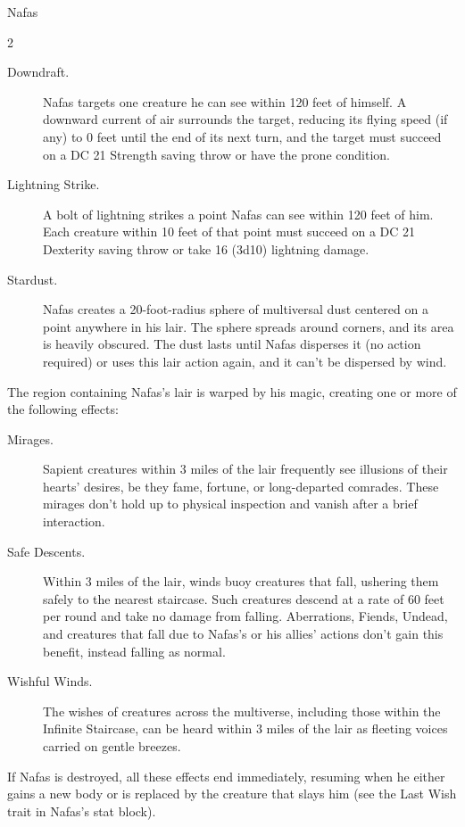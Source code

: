 \documentclass[10pt,a4paper,twoside,bg=print,twocolumn,openany,nodeprecatedcode]{dndbook}
\begin{document}
\begin{DndMonster}[float*=b,width=\textwidth + 8pt]{Nafas}
\begin{multicols}{2}
\begin{description}
\item[Downdraft.]
Nafas targets one creature he can see within 120 feet of himself. A downward current of air surrounds the target, reducing its flying speed (if any) to 0 feet until the end of its next turn, and the target must succeed on a DC 21 Strength saving throw or have the prone condition.
\item[Lightning Strike.]
A bolt of lightning strikes a point Nafas can see within 120 feet of him. Each creature within 10 feet of that point must succeed on a DC 21 Dexterity saving throw or take 16 (3d10) lightning damage.
\item[Stardust.]
Nafas creates a 20-foot-radius sphere of multiversal dust centered on a point anywhere in his lair. The sphere spreads around corners, and its area is heavily obscured. The dust lasts until Nafas disperses it (no action required) or uses this lair action again, and it can't be dispersed by wind.
\end{description}

The region containing Nafas's lair is warped by his magic, creating one or more of the following effects:


\begin{description}
\item[Mirages.]
Sapient creatures within 3 miles of the lair frequently see illusions of their hearts' desires, be they fame, fortune, or long-departed comrades. These mirages don't hold up to physical inspection and vanish after a brief interaction.
\item[Safe Descents.]
Within 3 miles of the lair, winds buoy creatures that fall, ushering them safely to the nearest staircase. Such creatures descend at a rate of 60 feet per round and take no damage from falling. Aberrations, Fiends, Undead, and creatures that fall due to Nafas's or his allies' actions don't gain this benefit, instead falling as normal.
\item[Wishful Winds.]
The wishes of creatures across the multiverse, including those within the Infinite Staircase, can be heard within 3 miles of the lair as fleeting voices carried on gentle breezes.
\end{description}

If Nafas is destroyed, all these effects end immediately, resuming when he either gains a new body or is replaced by the creature that slays him (see the Last Wish trait in Nafas's stat block).

\end{multicols}
\end{DndMonster}
\end{document}
